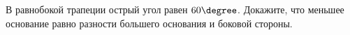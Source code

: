 \begin{ex}
	\begin{condition}
		В равнобокой трапеции острый угол равен \( 60\degree \). Докажите, что меньшее основание равно разности большего основания и боковой стороны.
	\end{condition}
\end{ex}